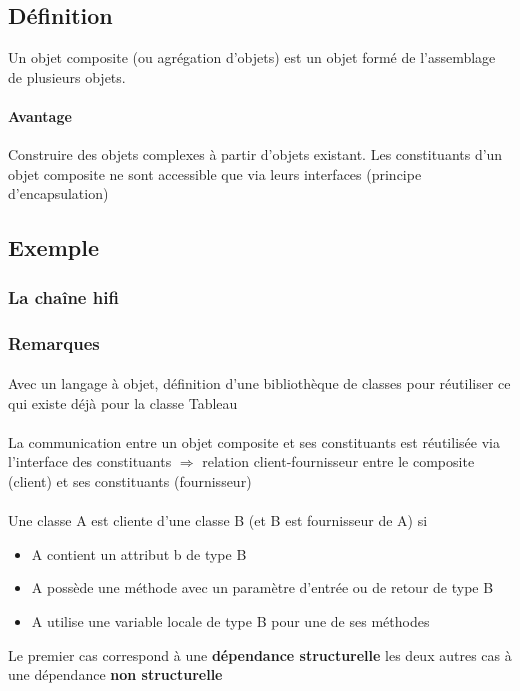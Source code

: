 \subsection{Définition}
Un objet composite (ou agrégation d'objets) est un objet formé de l'assemblage de plusieurs
objets. 
\paragraph{Avantage} Construire des objets complexes à partir d'objets existant.
Les constituants d'un objet composite ne sont accessible que via leurs interfaces (principe
d'encapsulation)
\subsection{Exemple}
\subsubsection{La chaîne hifi}
\begin{center}
	
\end{center}
	
\subsubsection{Remarques}
\paragraph{}Avec un langage à objet, définition d'une bibliothèque de classes pour réutiliser 
ce qui existe déjà pour la classe Tableau 
\paragraph{}
La communication entre un objet composite et ses constituants est réutilisée via l'interface 
des constituants $\Rightarrow$ relation client-fournisseur entre le composite (client) et 
ses constituants (fournisseur)
\paragraph{}Une classe A est cliente d'une classe B (et B est fournisseur de A) si
\begin{itemize}
\item A contient un attribut b de type B
\item A possède une méthode avec un paramètre d'entrée ou de retour de type B
\item A utilise une variable locale de type B pour une de ses méthodes
\end{itemize}
Le premier cas correspond à une \textbf{dépendance structurelle} les deux autres cas à une
dépendance \textbf{non structurelle }

